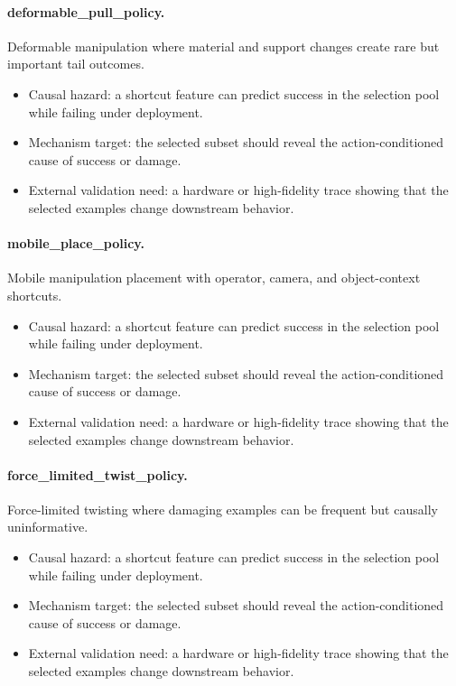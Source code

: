 \documentclass{article}
\begin{document}
\paragraph{deformable\_pull\_policy.} Deformable manipulation where material and support changes create rare but important tail outcomes.
\begin{itemize}
\item Causal hazard: a shortcut feature can predict success in the selection pool while failing under deployment.
\item Mechanism target: the selected subset should reveal the action-conditioned cause of success or damage.
\item External validation need: a hardware or high-fidelity trace showing that the selected examples change downstream behavior.
\end{itemize}
\paragraph{mobile\_place\_policy.} Mobile manipulation placement with operator, camera, and object-context shortcuts.
\begin{itemize}
\item Causal hazard: a shortcut feature can predict success in the selection pool while failing under deployment.
\item Mechanism target: the selected subset should reveal the action-conditioned cause of success or damage.
\item External validation need: a hardware or high-fidelity trace showing that the selected examples change downstream behavior.
\end{itemize}
\paragraph{force\_limited\_twist\_policy.} Force-limited twisting where damaging examples can be frequent but causally uninformative.
\begin{itemize}
\item Causal hazard: a shortcut feature can predict success in the selection pool while failing under deployment.
\item Mechanism target: the selected subset should reveal the action-conditioned cause of success or damage.
\item External validation need: a hardware or high-fidelity trace showing that the selected examples change downstream behavior.
\end{itemize}
\clearpage
\end{document}
